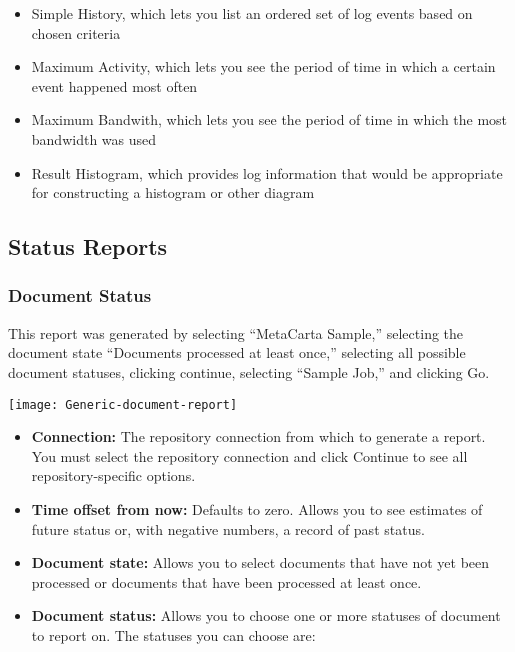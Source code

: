 \begin{changemargin}{1.5in}{0in}
\begin{itemize}
\item Simple History, which lets you list an ordered set of log events
based on chosen criteria

\item Maximum Activity, which lets you see the period of time in
which a certain event happened most often

\item Maximum Bandwith, which lets you see the period of time in
which the most bandwidth was used 

\item Result Histogram, which provides log information that would be
appropriate for constructing a histogram or other diagram

\end{itemize}

\subsection{Status Reports}


\subsubsection{Document Status}

This report was generated by selecting ``MetaCarta Sample,'' selecting
the document state ``Documents processed at least once,'' selecting all 
possible document statuses, clicking continue, selecting ``Sample Job,''
and clicking Go.

\texttt{[image: Generic-document-report]}

\begin{itemize}

\item \textbf{Connection:} The repository connection from which to 
generate a report. You must select the repository connection and click
Continue to see all repository-specific options. %

\item \textbf{Time offset from now:} Defaults to zero. Allows you to
see estimates of future status or, with negative numbers, a record of
past status.

\item \textbf{Document state:} Allows you to select documents that
have not yet been processed or documents that have been processed
at least once.

\item \textbf{Document status:} Allows you to choose one or more 
statuses of document to report on. The statuses you can choose are:


\end{itemize}
\end{changemargin}
